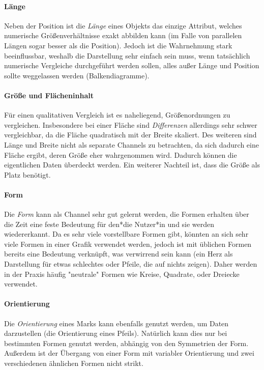				\paragraph{Länge}
					Neben der Position ist die \emph{Länge} eines Objekts das einzige Attribut, welches numerische Größenverhältnisse exakt abbilden kann (im Falle von parallelen Längen sogar besser als die Position). Jedoch ist die Wahrnehmung stark beeinflussbar, weshalb die Darstellung sehr einfach sein muss, wenn tatsächlich numerische Vergleiche durchgeführt werden sollen, \dh alles außer Länge und Position sollte weggelassen werden (Balkendiagramme).

				\paragraph{Größe und Flächeninhalt}
					Für einen qualitativen Vergleich ist es naheliegend, Größenordnungen zu vergleichen. Insbesondere bei einer Fläche sind \emph{Differenzen} allerdings sehr schwer vergleichbar, da die Fläche quadratisch mit der Breite skaliert. Des weiteren sind Länge und Breite nicht als separate Channels zu betrachten, da sich dadurch eine Fläche ergibt, deren Größe eher wahrgenommen wird. Dadurch können die eigentlichen Daten überdeckt werden. Ein weiterer Nachteil ist, dass die Größe als Platz benötigt.

				\paragraph{Form}
					Die \emph{Form} kann als Channel sehr gut gelernt werden, \dh die Formen erhalten über die Zeit eine feste Bedeutung für den*die Nutzer*in und sie werden wiedererkannt. Da es sehr viele vorstellbare Formen gibt, könnten an sich sehr viele Formen in einer Grafik verwendet werden, jedoch ist mit üblichen Formen bereits eine Bedeutung verknüpft, was verwirrend sein kann (\bspw ein Herz als Darstellung für etwas schlechtes oder Pfeile, die auf nichts zeigen). Daher werden in der Praxis häufig "neutrale" Formen wie Kreise, Quadrate, oder Dreiecke verwendet.

				\paragraph{Orientierung}
					Die \emph{Orientierung} eines Marks kann ebenfalls genutzt werden, um Daten darzustellen (\bspw die Orientierung eines Pfeils). Natürlich kann dies nur bei bestimmten Formen genutzt werden, abhängig von den Symmetrien der Form. Außerdem ist der Übergang von einer Form mit variabler Orientierung und zwei verschiedenen ähnlichen Formen nicht strikt.

